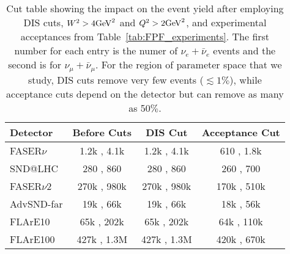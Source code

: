 \begin{table}[t]
  \centering
  \small
  \renewcommand{\arraystretch}{1.70}
  \begin{tabularx}{0.8\textwidth}{p{}|c|c|c}
    \toprule
    Detector & Before Cuts & DIS Cut & Acceptance Cut \\
    \midrule
    \midrule
    FASER$\nu$ & 1.2k , 4.1k & 1.2k , 4.1k & 610 , 1.8k \\
    SND@LHC & 280 , 860 & 280 , 860 & 260 , 700 \\
    \midrule
    \midrule
    FASER$\nu$2 & 270k , 980k & 270k , 980k  & 170k , 510k \\
    AdvSND-far & 19k , 66k & 19k , 66k & 18k , 56k\\
    FLArE10 & 65k , 202k & 65k , 202k  & 64k , 110k \\
    FLArE100 & 427k , 1.3M &427k , 1.3M  & 420k , 670k \\
    \bottomrule
  \end{tabularx}
  \vspace{0.2cm}
\caption{Cut table showing the impact on the event yield after employing DIS cuts, $W^2 > 4{\rm GeV}^2$ and $Q^2 > 2{\rm GeV}^2$, and experimental acceptances from Table~\ref{tab:FPF_experiments}. The first number for each entry is the numer of $\nu_e + \bar{\nu}_e$ events and the second is for $\nu_{\mu} + \bar{\nu}_{\mu}$.  For the region of parameter space that we study, DIS cuts remove very few events ($\lesssim 1\%$), while acceptance cuts depend on the detector but can remove as many as 50$\%$.}
\label{tab:acceptance}
\end{table}
